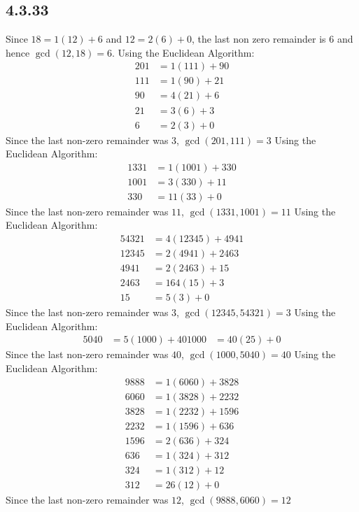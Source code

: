 \documentclass[12pt,titlepage]{extarticle}
\begin{document}
\subsection*{4.3.33}
\begin{tasks}
    \task Since $18 = 1(12) + 6$ and $12 = 2(6) + 0$, the last non zero remainder is $6$ and hence $\gcd(12, 18) = 6$.
    \task Using the Euclidean Algorithm:
    \begin{align*}
        201 &= 1(111) + 90 \\
        111 &= 1(90) + 21 \\
        90 &= 4(21) + 6 \\
        21 &= 3(6) + 3 \\
        6 &= 2(3) + 0
    \end{align*}
    Since the last non-zero remainder was $3$, $\gcd(201, 111) = 3$
    \task Using the Euclidean Algorithm:
    \begin{align*}
        1331 &= 1(1001) + 330 \\
        1001 &= 3(330) + 11 \\
        330 &= 11(33) + 0
    \end{align*}
    Since the last non-zero remainder was $11$, $\gcd(1331, 1001) = 11$
    \task Using the Euclidean Algorithm:
    \begin{align*}
        54321 &= 4(12345) + 4941 \\
        12345 &= 2(4941) + 2463 \\
        4941 &= 2(2463) + 15 \\
        2463 &= 164(15) + 3 \\
        15 &= 5(3) + 0
    \end{align*}
    Since the last non-zero remainder was $3$, $\gcd(12345, 54321) = 3$
    \task Using the Euclidean Algorithm:
    \begin{align*}
        5040 &= 5(1000) + 40
        1000 &= 40(25) + 0
    \end{align*}
    Since the last non-zero remainder was $40$, $\gcd(1000, 5040) = 40$
    \task Using the Euclidean Algorithm:
    \begin{align*}
        9888 &= 1(6060) + 3828 \\
        6060 &= 1(3828) + 2232 \\
        3828 &= 1(2232) + 1596 \\
        2232 &= 1(1596) + 636 \\
        1596 &= 2(636) + 324 \\
        636 &= 1(324) + 312 \\
        324 &= 1(312) + 12 \\
        312 &= 26(12) + 0
    \end{align*}
    Since the last non-zero remainder was $12$, $\gcd(9888, 6060) = 12$
\end{tasks}
\end{document}
